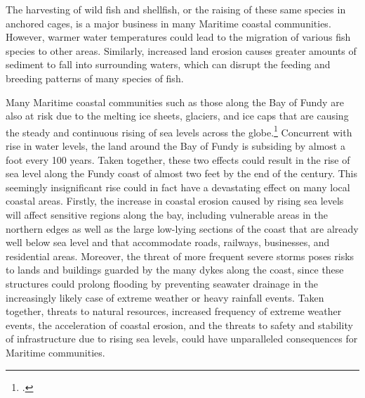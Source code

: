 The harvesting of wild fish and shellfish, or the raising of these same species in anchored cages, is a major business in many Maritime coastal communities.  
However, warmer water temperatures could lead to the migration of various fish species to other areas. 
Similarly, increased land erosion causes greater amounts of sediment to fall into surrounding waters, which can disrupt the feeding and breeding patterns of many species of fish.



Many Maritime coastal communities such as those along the Bay of Fundy are also at risk due to the melting ice sheets, glaciers, and ice caps that are causing the steady and continuous rising of sea levels across the globe.\footcite[][]{PercyRisingTide}
Concurrent with rise in water levels, the land around the Bay of Fundy is subsiding by almost a foot every 100 years.
Taken together, these two effects could result in the rise of sea level along the Fundy coast of almost two feet by the end of the century.
This seemingly insignificant rise could in fact have a devastating effect on many local coastal areas.
Firstly, the increase in coastal erosion caused by rising sea levels will affect sensitive regions along the bay, including vulnerable areas in the northern edges as well as the large low-lying sections of the coast that are already well below sea level and that accommodate roads, railways, businesses, and residential areas. 
Moreover, the threat of more frequent severe storms poses risks to lands and buildings guarded by the many dykes along the coast, since these structures could prolong flooding by preventing seawater drainage in the increasingly likely case of extreme weather or heavy rainfall events. 
Taken together, threats to natural resources, increased frequency of extreme weather events, the acceleration of coastal erosion, and the threats to safety and stability of infrastructure due to rising sea levels, could have unparalleled consequences for Maritime communities. 






